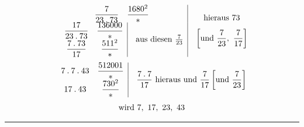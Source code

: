 \par{}%
\[
\begin{array}{c|}
\begin{array}{cc}\dfrac7{23\mathbin{.}73}&\dfrac{1680^2}{*}\end{array}\\[4pt]
\begin{array}{cc|}\dfrac{17}{23\mathbin{.}73}&\dfrac{136000}{*}\\[4pt]\dfrac{7\mathbin{.}73}{17}&\dfrac{511^2}{*}\end{array}\quad\text{aus diesen }\frac7{23}
\end{array}\quad\begin{gathered}\text{hieraus }73\\[3pt]\left[\text{und }\frac7{23},\ \frac7{17}\right]\end{gathered}
\]
\[
\begin{gathered}
\begin{array}{cc|}7\mathbin{.}7\mathbin{.}43&\dfrac{512001}{*}\\[4pt]17\mathbin{.}43&\dfrac{730^2}{*}\end{array}\quad
\frac{7\mathbin{.}7}{17}\ \text{hieraus und }\frac7{17}\left[\text{und }\frac7{23}\right]\\[3pt]
\text{wird }7,\ 17,\ 23,\ 43
\end{gathered}
\]\par\medskip\noindent\rule{.32\textwidth}{.3pt}
\begingroup\renewcommand{\arraystretch}{2.15}
